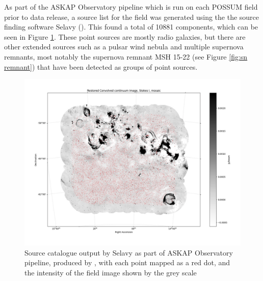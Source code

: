 As part of the ASKAP Observatory pipeline which is run on each POSSUM field prior to data release, a source list for the field was generated using the the source finding software Selavy (\cite{Selavy_Whiting_2012}). This found a total of 10881 components, which can be seen in Figure \ref{fig: validation_selavy}. These point sources are mostly radio galaxies, but there are other extended sources such as a pulsar wind nebula and multiple supernova remnants, most notably the supernova remnant MSH 15-22 (see Figure \ref{fig:sn remnant}) that have been detected as groups of point sources. 


\begin{figure}

\includegraphics[width=\linewidth]{Thesis_Template/Figures/validation_sourcefinder.png}
\caption{Source catalogue output by Selavy as part of ASKAP Observatory pipeline, produced by \cite{validation}, with each point mapped as a red dot, and the intensity of the field image shown by the grey scale}
\label{fig: validation_selavy}
\end{figure}

